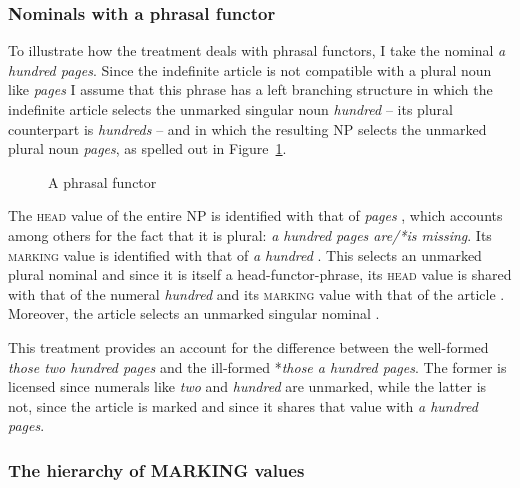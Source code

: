 \documentclass[output=paper
	        ,collection
	        ,collectionchapter
 	        ,biblatex
                ,babelshorthands
                ,newtxmath
                ,draftmode
                ,colorlinks, citecolor=brown
]{langscibook}
\begin{document}
        
\subsubsection{Nominals with a phrasal functor} 
\label{sec-phrasal-spec}


To illustrate how the treatment deals with phrasal functors, I
take the nominal \emph{a hundred pages}. Since the indefinite article is not 
compatible with a plural noun like \emph{pages} I assume that this phrase  
has a left branching structure in which the indefinite article selects 
the unmarked singular noun \emph{hundred} -- its plural counterpart is \emph{hundreds} --  
and in which the resulting NP selects the unmarked plural noun 
\emph{pages}, as spelled out in Figure~\ref{glorie}. 
 
\begin{figure}
\centering
{}
\caption{\label{glorie} A phrasal functor}
\end{figure}

The \textsc{head} value of the entire NP is identified with that 
of \emph{pages} , which accounts among others for the fact that it is plural:
\emph{a hundred pages are/*is missing}. 
Its \textsc{marking} value is identified with that of \emph{a hundred} 
. This selects an unmarked plural nominal  and 
since it is itself a head-functor-phrase, its \textsc{head} value is shared with 
that of the numeral \emph{hundred}  and its \textsc{marking} value 
with that of the article . Moreover, the article selects an unmarked 
singular nominal .
 
This treatment provides an account for the difference between 
the well-formed \emph{those two hundred pages} and the 
ill-formed *\emph{those a hundred pages}. The former is licensed since numerals 
like \emph{two} and \emph{hundred} are unmarked, while the latter is not, since 
the article is marked and since it shares that value with \emph{a hundred pages}.  


\subsubsection{The hierarchy of MARKING values} 
\label{sec-without-spec}
\end{document}
